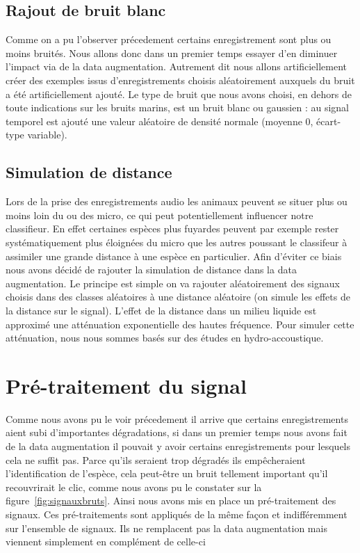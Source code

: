\hypertarget{Rajout-de-bruit-blanc}{%
\subsection{Rajout de bruit blanc}
\label{Rajout-de-bruit-blanc}}

Comme on a pu l'observer précedement certains enregistrement sont plus ou moins bruités.
Nous allons donc dans un premier temps essayer d'en diminuer l'impact via de la data augmentation. Autrement dit nous allons artificiellement créer des exemples issus d'enregistrements choisis aléatoirement auxquels du bruit a été artificiellement ajouté.
Le type de bruit que nous avons choisi, en dehors de toute indications sur les bruits marins, est un bruit blanc ou gaussien : au signal temporel est ajouté une valeur aléatoire de densité normale (moyenne 0, écart-type variable).

\hypertarget{Simulation-de-distance}{%
\subsection{Simulation de distance}
\label{Simulation-de-distance}}

Lors de la prise des enregistrements audio les animaux peuvent se situer plus ou moins loin du ou des micro, ce qui peut potentiellement influencer notre classifieur. 
En effet certaines espèces plus fuyardes peuvent par exemple rester systématiquement plus 
éloignées du micro que les autres poussant le classifeur à assimiler 
une grande distance à une espèce en particulier.
Afin d'éviter ce biais nous avons décidé de rajouter la simulation de distance dans la data augmentation.
Le principe est simple on va rajouter aléatoirement des signaux choisis dans des classes aléatoires à une distance aléatoire (on simule les effets de la distance sur le signal).
L'effet de la distance dans un milieu liquide est approximé une atténuation exponentielle des hautes fréquence. 
Pour simuler cette atténuation, nous nous sommes basés sur des études en hydro-accoustique.

\hypertarget{Traitement-du-signal}{%
\section{Pré-traitement du signal}
\label{Traitement-du-signal}}

Comme nous avons pu le voir précedement il arrive que certains enregistrements aient subi d'importantes dégradations, si dans un premier temps nous avons fait de la data augmentation il pouvait y avoir certains enregistrements pour lesquels cela ne suffit pas. 
Parce qu'ils seraient trop dégradés ils empêcheraient l'identification de l'espèce, cela peut-être un bruit tellement important qu'il recouvrirait le clic, comme nous avons pu le constater sur la figure~\ref{fig:signauxbruts}. 
Ainsi nous avons mis en place un pré-traitement des signaux. 
Ces pré-traitements sont appliqués de la même façon et indifféremment sur l'ensemble de signaux.
Ils ne remplacent pas la data augmentation mais viennent simplement en complément de celle-ci

